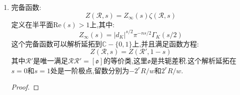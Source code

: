 \begin{enumerate}
\begin{proof}
		我们证明过Theta函数的变换公式:
		$$\theta_{\Gamma}(-1/z)=\frac{\sqrt{\mathrm{N}(z/i)}}{\mathrm{vol}(\Gamma)}\theta_{\Gamma'}(z)$$
		取整理想$\Gamma=\mathfrak{a}$,我们证明过它的基本网孔的体积是:
		$$\mathrm{vol}(\Gamma)=\mathfrak{R}(\mathfrak{a})|d_K|^{1/2}$$
		我们还计算过对偶格满足:
		$${^*\Gamma}'=(\mathfrak{a}\mathfrak{o})^{-1}$$
		按照$\langle({^*g})z,{^*g}\rangle=\langle gz,g\rangle$,就有:
		$$\theta_{\Gamma'}(z)=\theta_{{^*\Gamma}'}(z)$$
		另外有:
		$$d_{(\mathfrak{a}\mathfrak{o})^{-1}}=\mathfrak{R}(\mathfrak{a})^{-2}\mathfrak{R}(\mathfrak{o})^{-2}|d_K|=1/(\mathfrak{R}(\mathfrak{a})^2|d_K|)=1/d_{\mathfrak{a}}$$
		按照$x\mapsto x^{-1}$固定$\textbf{S}$上的规范测度(也即$x\mapsto-x$固定$\mathbb{R}^n$上的勒贝格测度),并且把$F$的基本网孔映为$F^{-1}$的基本网孔.这里$\ln{F^{-1}}$仍然是完备格$2\ln|\mathscr{O}^*|$的基本网孔.对$x\in\textbf{S}$有$\mathrm{N}\left(x(td_{\mathfrak{a}})^{1/n}\right)=td_{\mathfrak{a}}$.于是:
		\begin{align*}
			f_F(\mathfrak{a},1/t)=\frac{1}{w}\int_F\theta_{\mathfrak{a}}\left(ix/(td_{\mathfrak{a}})^{1/n}\right)\mathrm{d}^*x\\&=\frac{1}{w}\int_{F^{-1}}\theta_{\mathfrak{a}}\left(-1/ix(td_{\mathfrak{a}})^{1/n}\right)\mathrm{d}^*x\\&=\frac{1}{w}\frac{(td_{\mathfrak{a}})^{1/2}}{\mathrm{vol}(\mathfrak{a})}\int_{F^{-1}}\theta_{(\mathfrak{a}\mathfrak{o})^{-1}}\left(ixt^{1/n}d_{(\mathfrak{a}\mathfrak{o})^{-1/n}}\right)\mathrm{d}^*x\\&=t^{1/2}f_{F^{-1}}\left((\mathfrak{a}\mathfrak{o})^{-1},t\right)
		\end{align*}
		最后有:
		$$f_F(\mathfrak{a},t)=\frac{1}{w}\int_F\mathrm{d}^*x+\frac{1}{w}\left(\theta(\mathfrak{a},ixt^{1/n})-1\right)\mathrm{d}^*x=\frac{\mathrm{vol}(F)}{w}+r(t)$$
		这里$\theta(\mathfrak{a},ixt^{1/n})-1=\sum_{0\not=a\in\mathfrak{a}}e^{-\pi\langle ax,a\rangle {t'}^{1/n}}$,其中$t'=t/d_{\mathfrak{a}}$.按照$F$包含在紧集$\overline{F}$中,于是可设对任意$\tau$有$x_{\tau}\ge\delta>0$,进而有$\langle ax,a\rangle=\sum_{\tau}|\tau a|^2x_{\tau}\ge\delta\langle a,a\rangle$.于是:
		$$r(t)\le\frac{\mathrm{vol}(F)}{w}\left(\theta_{\mathfrak{a}}(i\delta{t'}^{1/n})-1\right)$$
		设$m=\min\{\langle a,a\rangle\mid a\in\mathfrak{a},a\not=0\}$和$M=\#\{a\in\mathfrak{a}\mid\langle a,a\rangle=m\}$,那么有:
		$$\theta_{\mathfrak{a}}(i\delta{t'}^{1/n})-1=e^{-\pi\delta m{t'}^{1/n}}\left(M+\sum_{\langle a,a\rangle>m}e^{-\pi\delta(\langle a,a\rangle-m){t'}^{1/n}}\right)=O(e^{-ct^{1/n}}),c=\pi\delta m/d_{\mathfrak{a}}^{1/n}$$
	\end{proof}
    \item 完备函数:
    $$Z(\mathscr{R},s)=Z_{\infty}(s)\zeta(\mathscr{R},s)$$
    定义在半平面$\mathrm{Re}(s)>1$上,其中:
    $$Z_{\infty}(s)=|d_K|^{s/2}\pi^{-ns/2}\Gamma_K(s/2)$$
    这个完备函数可以解析延拓到$\mathbb{C}-\{0,1\}$上,并且满足函数方程:
    $$Z(\mathscr{R},s)=Z(\mathscr{R}',1-s)$$
    其中$\mathscr{R}'$是唯一满足$\mathscr{R}\mathscr{R}'=[\mathfrak{o}]$的等价类,这里$\mathfrak{o}$是共轭差积.这个解析延拓在$s=0$和$s=1$处是一阶极点,留数分别为$-2^rR/w$和$2^rR/w$.
    \begin{proof}
    	

\end{proof}
\end{enumerate}
